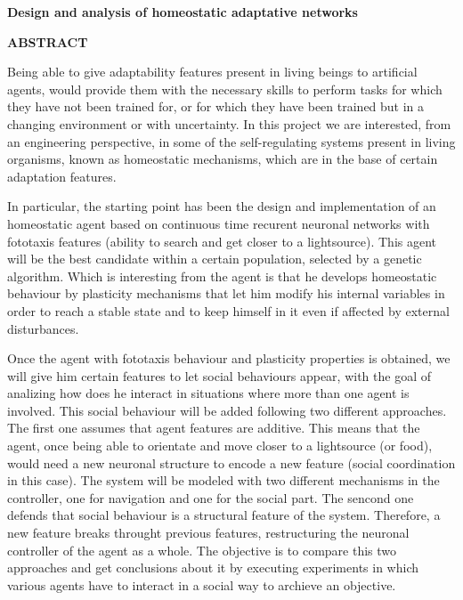 \begin{center}
{\Large \bfseries Design and analysis of homeostatic adaptative networks}

\vspace{1cm}
{\Large \bfseries ABSTRACT}

\vspace{1.5cm}
\end{center}

Being able to give adaptability features present in living beings to artificial agents, would provide them with the
necessary skills to perform tasks for which they have not been trained for, or for which they have been trained
but in a changing environment or with uncertainty. In this project we are interested, from an engineering perspective, in
some of the self-regulating systems present in living organisms, known as homeostatic mechanisms, which are in the base of
certain adaptation features.

In particular, the starting point has been the design and implementation of an homeostatic agent based on continuous time recurent
neuronal networks with fototaxis features (ability to search and get closer to a lightsource). This agent will be the
best candidate within a certain population, selected by a genetic algorithm. Which is interesting from the agent is that he
develops homeostatic behaviour by plasticity mechanisms that let him modify his internal variables in order to reach a
stable state and to keep himself in it even if affected by external disturbances.

Once the agent with fototaxis behaviour and plasticity properties is obtained, we will give him certain features to let social behaviours appear,
with the goal of analizing how does he interact in situations where more than one agent is involved. This social behaviour will be added following two
different approaches. The first one assumes that agent features are additive. This means that the agent, once being
able to orientate and move closer to a lightsource (or food), would need a new neuronal structure to encode a new feature (social
coordination in this case). The system will be modeled with two different mechanisms in the controller, one for navigation
and one for the social part. The sencond one defends that social behaviour is a structural feature of the system. Therefore,
a new feature breaks throught previous features, restructuring the neuronal controller of the agent as a whole. The objective
is to compare this two approaches and get conclusions about it by executing experiments in which various agents have to interact in
a social way to archieve an objective.
